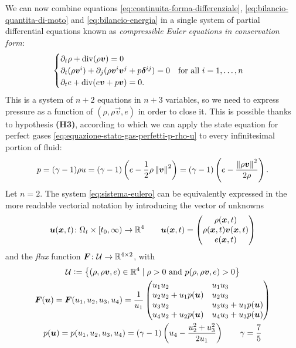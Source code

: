 We can now combine equations \eqref{eq:continuita-forma-differenziale},
\eqref{eq:bilancio-quantita-di-moto} and \eqref{eq:bilancio-energia}
in a single system of partial differential equations known as
\emph{compressible Euler equations in conservation form}:
\begin{equation} \label{eq:sistema-eulero}
\begin{cases}
\partial_t \rho + \operatorname{div}(\rho \bm{v}) = 0 \\
\partial_t (\rho \bm{v}^i)
	+ \partial_j (\rho \bm{v}^i \bm{v}^j + p\bm{\delta}^{ij})
	= 0 \quad \text{for all $i = 1,\dots,n$} \\
\partial_t e + \operatorname{div}(e \bm{v} + p \bm{v}) = 0.
\end{cases}
\end{equation}
This is a system of $n+2$ equations in $n+3$ variables, so we need
to express pressure as a function of $(\rho,\rho\vec{v},e)$ in order to close it.
This is possible thanks to hypothesis \textbf{(H3)}, according to which
we can apply the state equation for perfect gases
\eqref{eq:equazione-stato-gas-perfetti-p-rho-u} to every infinitesimal
portion of fluid:
\[
p
= (\gamma-1) \rho u
= (\gamma-1) \left( e - \frac{1}{2} \rho \left\lVert\bm{v}\right\rVert^2 \right)
= (\gamma-1) \left( e - \frac{\left\lVert\rho \bm{v}\right\rVert^2}{2\rho} \right).
\]
Let $n = 2$. The system \eqref{eq:sistema-eulero} can be equivalently
expressed in the more readable vectorial notation by introducing
the vector of unknowns
\[
\bm{u}(\bm{x},t) \colon \Omega_t \times [t_0,\infty) \to \mathbb{R}^4
\qquad \bm{u}(\bm{x},t)
= \begin{pmatrix} \rho(\bm{x},t) \\
\rho(\bm{x},t) \bm{v}(\bm{x},t) \\
e(\bm{x},t) \end{pmatrix}
\]
and the \emph{flux} function
$\bm{F} \colon \mathcal{U} \to \mathbb{R}^{4 \times 2}$, with
\begin{gather*}
\mathcal{U} \deq \left\{ (\rho,\rho\vec{v},e) \in \R^4
	\mid \rho > 0 \text{ and } p(\rho,\rho\vec{v}, e) > 0 \right\} \\
\tns{F}(\vec{u}) =
\tns{F}(u_1,u_2,u_3,u_4) =
\frac{1}{u_1}
\begin{pmatrix*}[l]
u_1 u_2            & u_1 u_3            \\
u_2 u_2 + u_1 p(\vec{u}) & u_2 u_3            \\
u_3 u_2            & u_3 u_3 + u_1 p(\vec{u}) \\
u_4 u_2 + u_2 p(\vec{u}) & u_4 u_3 + u_3 p(\vec{u})
\end{pmatrix*} \\
p(\vec{u})
= p(u_1,u_2,u_3,u_4)
= (\gamma-1) \left( u_4 - \frac{u_2^2+u_3^2}{2 u_1} \right)
	\qquad \gamma = \frac{7}{5}
\end{gather*}
